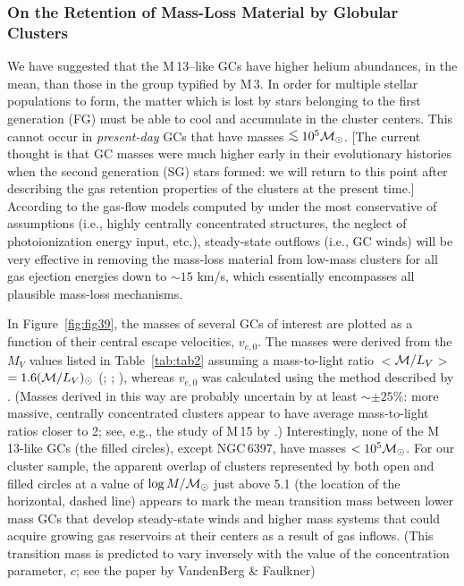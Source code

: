 \documentclass[12pt,preprint]{aastex}
\newcommand\msol{{\cal M_{\odot}}}
\newcommand\lta{\mathrel{\hbox{\raise 0.6 ex \hbox{$<$}\kern
                   -1.8 ex\lower .5 ex\hbox{$\sim$}}}}
\begin{document}
\subsubsection{On the Retention of Mass-Loss Material by Globular Clusters}
\label{subsubsec:gas}

We have suggested that the M$\,$13--like GCs have higher helium abundances, in
the mean, than those in the group typified by M$\,$3.  In order for multiple
stellar populations to form, the matter which is lost by stars belonging to the
first generation (FG) must be able to cool and accumulate in the cluster
centers.  This cannot occur in {\it present-day} GCs that have masses $\lta
10^5 \msol$.  [The current thought is that GC masses were much higher early in
their evolutionary histories when the second generation (SG) stars formed: we
will return to this point after describing the gas retention properties of the
clusters at the present time.]  According to the gas-flow models computed by
\citet{ff77} under the most conservative of assumptions (i.e., highly centrally
concentrated structures, the neglect of photoionization energy input, etc.),
steady-state outflows (i.e., GC winds) will be very effective in removing the
mass-loss material from low-mass clusters for all gas ejection energies down to
$\sim 15$ km/s, which essentially encompasses all plausible mass-loss
mechanisms.

In Figure~\ref{fig:fig39}, the masses of several GCs of interest are plotted as
a function of their central escape velocities, $v_{e,0}$.  The masses were
derived from the $M_V$ values listed in Table~\ref{tab:tab2} assuming a
mass-to-light ratio $<$${\cal M}/L_V$$>$ $ = 1.6 ({\cal M}/L_V)_\odot$
(\citealt{ill76}; \citealt{pmf91}; \citealt{ams02}), whereas
$v_{e,0}$ was calculated using the method described by \citet[see their
\S V]{vf77}.  (Masses derived in this way are probably uncertain by at least
$\sim \pm 25$\%: more massive, centrally concentrated clusters appear to have
average mass-to-light ratios closer to 2; see, e.g., the study of M$\,$15 by
\citealt{pdp04}.)  Interestingly, none of the M$\,$13-like GCs (the filled
circles), except NGC$\,$6397, have masses $< 10^5 \msol$.  For our cluster
sample, the apparent overlap of clusters represented by both open and filled
circles at a value of $\log M/\msol$ just above 5.1 (the location of the
horizontal, dashed line) appears to mark the mean transition mass between lower
mass GCs that develop steady-state winds and higher mass systems that could
acquire growing gas reservoirs at their centers as a result of gas inflows.
(This transition mass is predicted to vary inversely with the value of the
concentration parameter, $c$; see the paper by VandenBerg \& Faulkner)
\end{document}
